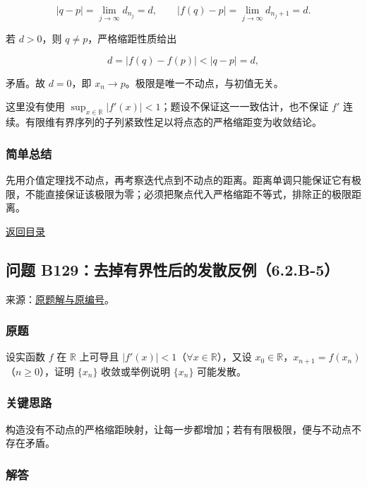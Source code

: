 \documentclass[11pt,a4paper]{article}
\begin{document}
\[
|q-p|=\lim_{j\to\infty}d_{n_j}=d,
\qquad
|f(q)-p|=\lim_{j\to\infty}d_{n_j+1}=d.
\]

若 \(d>0\)，则 \(q\ne p\)，严格缩距性质给出

\[
d=|f(q)-f(p)|<|q-p|=d,
\]

矛盾。故 \(d=0\)，即 \(x_n\to p\)。极限是唯一不动点，与初值无关。

这里没有使用
\(\sup_{x\in\mathbb R}|f'(x)|<1\)；题设不保证这一一致估计，也不保证
\(f'\)
连续。有限维有界序列的子列紧致性足以将点态的严格缩距变为收敛结论。

\subsubsection{简单总结}\label{ux7b80ux5355ux603bux7ed3-13}

先用介值定理找不动点，再考察迭代点到不动点的距离。距离单调只能保证它有极限，不能直接保证该极限为零；必须把聚点代入严格缩距不等式，排除正的极限距离。

\noindent\hyperref[contents]{返回目录}

\subsection{问题
B129：去掉有界性后的发散反例（6.2.B-5）}\label{ux95eeux9898-b129ux53bbux6389ux6709ux754cux6027ux540eux7684ux53d1ux6563ux53cdux4f8b6.2.b-5}

来源：\href{https://zj139.github.io/math-notes/problems/b69d1a64f6e3c089263e7de7/\#问题-b129}{原题解与原编号}。

\subsubsection{原题}\label{ux539fux9898-14}

设实函数 \(f\) 在 \(\mathbb R\) 上可导且
\(|f'(x)|<1\)（\(\forall x\in\mathbb R\)），又设
\(x_0\in\mathbb R\)，\(x_{n+1}=f(x_n)\)（\(n\ge0\)），证明 \(\{x_n\}\)
收敛或举例说明 \(\{x_n\}\) 可能发散。

\subsubsection{关键思路}\label{ux5173ux952eux601dux8def-14}

构造没有不动点的严格缩距映射，让每一步都增加；若有有限极限，便与不动点不存在矛盾。

\subsubsection{解答}\label{ux89e3ux7b54-14}
\end{document}
